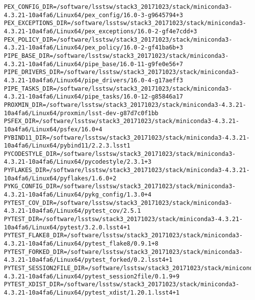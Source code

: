 \begin{verbatim}
PEX_CONFIG_DIR=/software/lsstsw/stack3_20171023/stack/miniconda3-4.3.21-10a4fa6/Linux64/pex_config/16.0-3-g9645794+3
PEX_EXCEPTIONS_DIR=/software/lsstsw/stack3_20171023/stack/miniconda3-4.3.21-10a4fa6/Linux64/pex_exceptions/16.0-2-gf4e7cdd+3
PEX_POLICY_DIR=/software/lsstsw/stack3_20171023/stack/miniconda3-4.3.21-10a4fa6/Linux64/pex_policy/16.0-2-gf41ba6b+3
PIPE_BASE_DIR=/software/lsstsw/stack3_20171023/stack/miniconda3-4.3.21-10a4fa6/Linux64/pipe_base/16.0-11-g9fe0e56+7
PIPE_DRIVERS_DIR=/software/lsstsw/stack3_20171023/stack/miniconda3-4.3.21-10a4fa6/Linux64/pipe_drivers/16.0-4-g17aeff3
PIPE_TASKS_DIR=/software/lsstsw/stack3_20171023/stack/miniconda3-4.3.21-10a4fa6/Linux64/pipe_tasks/16.0-12-g85846a17
PROXMIN_DIR=/software/lsstsw/stack3_20171023/stack/miniconda3-4.3.21-10a4fa6/Linux64/proxmin/lsst-dev-g87d7c0f1bb
PSFEX_DIR=/software/lsstsw/stack3_20171023/stack/miniconda3-4.3.21-10a4fa6/Linux64/psfex/16.0+4
PYBIND11_DIR=/software/lsstsw/stack3_20171023/stack/miniconda3-4.3.21-10a4fa6/Linux64/pybind11/2.2.3.lsst1
PYCODESTYLE_DIR=/software/lsstsw/stack3_20171023/stack/miniconda3-4.3.21-10a4fa6/Linux64/pycodestyle/2.3.1+3
PYFLAKES_DIR=/software/lsstsw/stack3_20171023/stack/miniconda3-4.3.21-10a4fa6/Linux64/pyflakes/1.6.0+2
PYKG_CONFIG_DIR=/software/lsstsw/stack3_20171023/stack/miniconda3-4.3.21-10a4fa6/Linux64/pykg_config/1.3.0+4
PYTEST_COV_DIR=/software/lsstsw/stack3_20171023/stack/miniconda3-4.3.21-10a4fa6/Linux64/pytest_cov/2.5.1
PYTEST_DIR=/software/lsstsw/stack3_20171023/stack/miniconda3-4.3.21-10a4fa6/Linux64/pytest/3.2.0.lsst4+1
PYTEST_FLAKE8_DIR=/software/lsstsw/stack3_20171023/stack/miniconda3-4.3.21-10a4fa6/Linux64/pytest_flake8/0.9.1+8
PYTEST_FORKED_DIR=/software/lsstsw/stack3_20171023/stack/miniconda3-4.3.21-10a4fa6/Linux64/pytest_forked/0.2.lsst4+1
PYTEST_SESSION2FILE_DIR=/software/lsstsw/stack3_20171023/stack/miniconda3-4.3.21-10a4fa6/Linux64/pytest_session2file/0.1.9+9
PYTEST_XDIST_DIR=/software/lsstsw/stack3_20171023/stack/miniconda3-4.3.21-10a4fa6/Linux64/pytest_xdist/1.20.1.lsst4+1

\end{verbatim}
